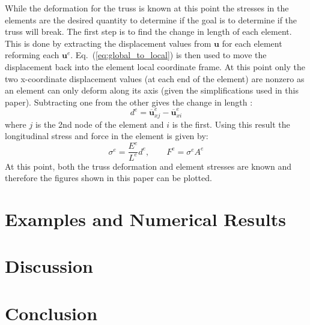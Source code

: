 \documentclass{article}
\begin{document}
While the deformation for the truss is known at this point the stresses in the
elements are the desired quantity to determine if the goal is to determine if
the truss will break.  The first step is to find the change in length of each
element.  This is done by extracting the displacement values from $\mathbf{u}$
for each element reforming each $\mathbf{u}^e$.
Eq.~(\ref{eq:global_to_local}) is then used to move the displacement back into
the element local coordinate frame.  At this point only the two x-coordinate
displacement values (at each end of the element) are nonzero as an element can
only deform along its axis (given the simplifications used in this paper).
Subtracting one from the other gives the change in length
\parencite{felippa2004ch3}:
\begin{equation}
    d^e=\overline{\mathbf{u}}^e_{xj}-\overline{\mathbf{u}}^e_{xi}
\end{equation}
where $j$ is the 2nd node of the element and $i$ is the first.  Using this
result the longitudinal stress and force in the element is given by:
\begin{equation}
    \sigma^e=\frac{E^e}{L^e}d^e,\qquad
    F^e=\sigma^eA^e
\end{equation}
At this point, both the truss deformation and element stresses are known and
therefore the figures shown in this paper can be plotted.






\section{Examples and Numerical Results}


\section{Discussion}


\section{Conclusion}


\printbibliography{}
\end{document}
